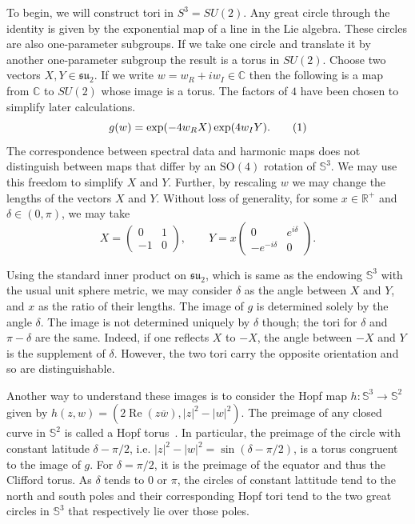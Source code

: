 \documentclass{article}
\numberwithin{equation}{section}
\numberwithin{figure}{section}
\newcommand{\labelthis}[1]{\addtocounter{equation}{1}\tag{\theequation}\label{#1}}
\renewcommand*{\bar}{\overline}
\newcommand{\abs}[1]{\left|#1\right|}
\DeclareMathOperator{\Real}{Re}
\newcommand{\iu}{i}
\newcommand{\R}{\mathbb{R}}
\newcommand{\C}{\mathbb{C}}
\renewcommand{\S}{\mathbb{S}}
\newcommand{\SO}{\mathrm{SO}}
\newcommand{\su}{\mathfrak{su}}
\begin{document}
To begin, we will construct tori in $S^3 = SU(2)$. Any great circle through the identity is given by the exponential map of a line in the Lie algebra. These circles are also one-parameter subgroups. If we take one circle and translate it by another one-parameter subgroup the result is a torus in $SU(2)$. Choose two vectors $X,Y\in \su_2$. If we write $w = w_R + \iu w_I \in \C$ then the following is a map from $\C$ to $SU(2)$ whose image is a torus. The factors of $4$ have been chosen to simplify later calculations. 
\[
g(w) = \exp( -4 w_R X ) \exp( 4 w_I Y ).
\labelthis{eqn:genus zero simple map}
\]
The correspondence between spectral data and harmonic maps does not distinguish between maps that differ by an $\SO(4)$ rotation of $\S^3$. We may use this freedom to simplify $X$ and $Y$. 
Further, by rescaling $w$ we may change the lengths of the vectors $X$ and $Y$. Without loss of generality, for some $x \in \R^+$ and $\delta\in (0,\pi)$, we may take 
\[
X = \begin{pmatrix}
0 & 1 \\ -1 & 0
\end{pmatrix}, \qquad
Y = x\begin{pmatrix}
0 & e^{\iu \delta} \\ -e^{-\iu \delta} & 0
\end{pmatrix}.
\]

Using the standard inner product on $\su_2$, which is same as the endowing $\S^3$ with the usual unit sphere metric, we may consider $\delta$ as the angle between $X$ and $Y$, and $x$ as the ratio of their lengths. The image of $g$ is determined solely by the angle $\delta$. The image is not determined uniquely by $\delta$ though; the tori for $\delta$ and $\pi-\delta$ are the same. Indeed, if one reflects $X$ to $-X$, the angle between $-X$ and $Y$ is the supplement of $\delta$. However, the two tori carry the opposite orientation and so are distinguishable.

Another way to understand these images is to consider the Hopf map $h : \S^3 \to \S^2$ given by $h(z,w) = (2\Real (z\bar{w}), \abs{z}^2 - \abs{w}^2)$. The preimage of any closed curve in $\S^2$ is called a Hopf torus~\cite{Pinkall1985}. In particular, the preimage of the circle with constant latitude $\delta-\pi/2$, i.e. $\abs{z}^2 - \abs{w}^2 = \sin(\delta - \pi/2)$, is a torus congruent to the image of $g$. For $\delta = \pi/2$, it is the preimage of the equator and thus the Clifford torus. As $\delta$ tends to $0$ or $\pi$, the circles of constant lattitude tend to the north and south poles and their corresponding Hopf tori tend to the two great circles in $\S^3$ that respectively lie over those poles.
\end{document}
